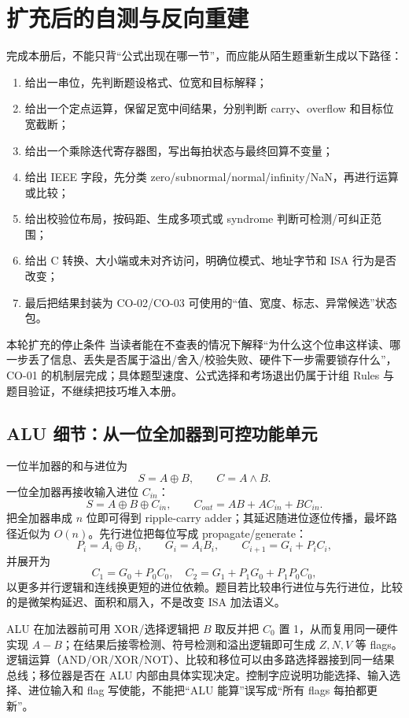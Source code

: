\documentclass[UTF8,fontset=fandol,11pt,a4paper]{ctexart}
\begin{document}
\section{扩充后的自测与反向重建}

完成本册后，不能只背“公式出现在哪一节”，而应能从陌生题重新生成以下路径：
\begin{enumerate}
  \item 给出一串位，先判断题设格式、位宽和目标解释；
  \item 给出一个定点运算，保留足宽中间结果，分别判断 carry、overflow 和目标位宽截断；
  \item 给出一个乘除迭代寄存器图，写出每拍状态与最终回算不变量；
  \item 给出 IEEE 字段，先分类 zero/subnormal/normal/infinity/NaN，再进行运算或比较；
  \item 给出校验位布局，按码距、生成多项式或 syndrome 判断可检测/可纠正范围；
  \item 给出 C 转换、大小端或未对齐访问，明确位模式、地址字节和 ISA 行为是否改变；
  \item 最后把结果封装为 CO-02/CO-03 可使用的“值、宽度、标志、异常候选”状态包。
\end{enumerate}

\begin{methodbox}{本轮扩充的停止条件}
当读者能在不查表的情况下解释“为什么这个位串这样读、哪一步丢了信息、丢失是否属于溢出/舍入/校验失败、硬件下一步需要锁存什么”，CO-01 的机制层完成；具体题型速度、公式选择和考场退出仍属于计组 Rules 与题目验证，不继续把技巧堆入本册。
\end{methodbox}

\subsection{ALU 细节：从一位全加器到可控功能单元}
一位半加器的和与进位为
\[
S=A\oplus B,\qquad C=A\land B.
\]
一位全加器再接收输入进位 $C_{in}$：
\[
S=A\oplus B\oplus C_{in},\qquad
C_{out}=AB+AC_{in}+BC_{in}.
\]
把全加器串成 $n$ 位即可得到 ripple-carry adder；其延迟随进位逐位传播，最坏路径近似为 $O(n)$。先行进位把每位写成 propagate/generate：
\[
P_i=A_i\oplus B_i,\qquad G_i=A_iB_i,\qquad C_{i+1}=G_i+P_iC_i,
\]
并展开为
\[
C_1=G_0+P_0C_0,\quad C_2=G_1+P_1G_0+P_1P_0C_0,
\]
以更多并行逻辑和连线换更短的进位依赖。题目若比较串行进位与先行进位，比较的是微架构延迟、面积和扇入，不是改变 ISA 加法语义。

ALU 在加法器前可用 XOR/选择逻辑把 $B$ 取反并把 $C_0$ 置 1，从而复用同一硬件实现 $A-B$；在结果后接零检测、符号检测和溢出逻辑即可生成 $Z,N,V$ 等 flags。逻辑运算（AND/OR/XOR/NOT）、比较和移位可以由多路选择器接到同一结果总线；移位器是否在 ALU 内部由具体实现决定。控制字应说明功能选择、输入选择、进位输入和 flag 写使能，不能把“ALU 能算”误写成“所有 flags 每拍都更新”。
\end{document}
